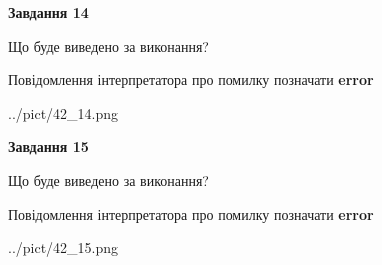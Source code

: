 \documentclass[11pt, ukrainian]{article}
\begin{document}
{\begin {large}
{\begin {center}\textbf{Завдання 14}\end {center}}\par
Що буде виведено за виконання? \par
Повідомлення інтерпретатора про помилку позначати \textbf{error}

\begin{center}
	{../pict/42_14.png}
\end{center}
\newpage

{\begin {center}\textbf{Завдання 15}\end {center}}\par
Що буде виведено за виконання? \par
Повідомлення інтерпретатора про помилку позначати \textbf{error}

\begin{center}
	{../pict/42_15.png}
\end{center}
\newpage

\end {large}}
\end{document}
